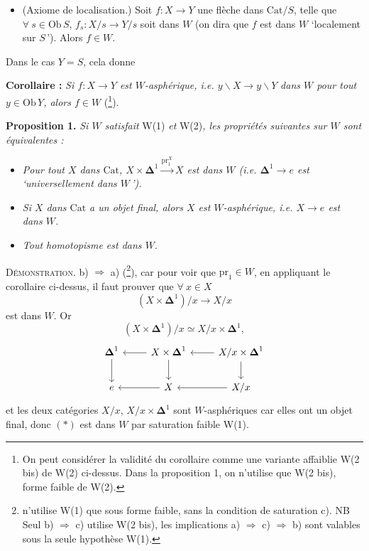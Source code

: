\documentclass[11pt]{article}
\newcommand{\printedpage}[1]{\marginpar{\footnotesize p.~#1}}
\newcommand{\Cat}{\mathrm{Cat}}
\newcommand{\Dl}{\boldsymbol{\Delta}}
\newcommand{\fl}{\longrightarrow}
\newcommand{\Ob}{\mathrm{Ob}\,}
\newcommand{\pr}{\mathrm{pr}}
\begin{document}
\begin{itemize}[leftmargin=*]
\item[\textbf{W(2)}] (Axiome de localisation.) Soit $f : X \fl Y$ une flèche dans $\Cat/S$, telle que $\forall\ s \in \Ob S$, $f_s : X/s \fl Y/s$ soit dans $W$ (on dira que $f$ est dans $W$ `localement sur $S$\,'). Alors $f \in W$.
\end{itemize}



Dans le cas $Y = S$, cela donne

\textbf{Corollaire :} \textit{Si $f : X \fl Y$ est $W$-asphérique, i.e. $y\backslash X \fl y\backslash Y$} \textit{dans $W$ pour tout $y \in \Ob Y$, alors $f \in W$} (\footnote{On peut considérer la validité du corollaire comme une variante affaiblie W(2 bis) de W(2) ci-dessus. Dans la proposition 1, on n'utilise que W(2 bis), forme faible de W(2).}).

\textbf{Proposition 1.} \textit{Si $W$ satisfait} W(1) \textit{et} W(2)\textit{, les propriétés suivantes sur $W$ sont équivalentes :}

\begin{itemize}[leftmargin=*]
\item[\textit{a)}] \textit{Pour tout $X$ dans $\Cat$, $X \times \Dl^1 \xrightarrow{\pr_1^X} X$ est dans $W$ (i.e. $\Dl^1 \fl e$ est `universellement dans $W$\,').}

\item[\textit{b)}] \textit{Si $X$ dans $\Cat$ a un objet final, alors $X$ est $W$-asphérique, i.e. $X \fl e$ est dans $W$.}

\item[\textit{c)}] \textit{Tout homotopisme est dans $W$.}
\end{itemize}

\clearpage

\printedpage{2}

\textsc{Démonstration.} b) $\Longrightarrow$ a) (\footnote{n'utilise W(1) que sous forme faible, sans la condition de saturation c). NB Seul b) $\Longrightarrow$ c) utilise W(2 bis), les implications a) $\Longrightarrow$ c) $\Longrightarrow$ b) sont valables sous la seule hypothèse W(1).}), car pour voir que $\pr_1 \in W$, en appliquant le corollaire ci-dessus, il faut prouver que $\forall\ x \in X$
\[ (X \times \Dl^1)/x \fl X/x \tag*{$(*)$} \]
est dans $W$. Or
\[ (X \times \Dl^1)/x \simeq X/x \times \Dl^1, \]
\[
\begin{tikzcd}
\Dl^1 \arrow[d] & X \times \Dl^1 \arrow[l] \arrow[d] & X/x \times \Dl^1 \arrow[l] \arrow[d] \\
e & X \arrow[l] & X/x \arrow[l]
\end{tikzcd}
\]
 et les deux catégories $X/x$, $X/x \times \Dl^1$ sont $W$-asphériques car elles ont un objet final, donc $(*)$ est dans $W$ par saturation faible W(1).
\end{document}
